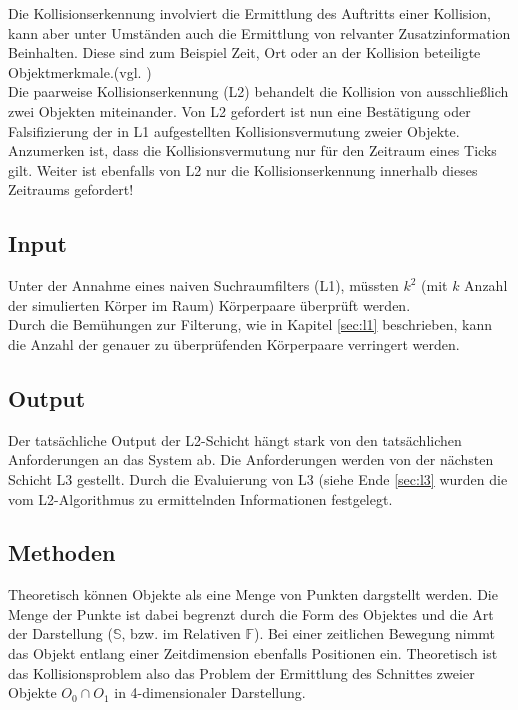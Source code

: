 
Die Kollisionserkennung involviert die Ermittlung des Auftritts einer Kollision, kann aber unter Umständen auch die Ermittlung von relvanter Zusatzinformation Beinhalten. Diese sind zum Beispiel Zeit, Ort oder an der Kollision beteiligte Objektmerkmale.(vgl. \cite[Abschn. 2]{cd2D})\\

Die paarweise Kollisionserkennung (L2) behandelt die Kollision von ausschließlich zwei Objekten miteinander. Von L2 gefordert ist nun eine Bestätigung oder Falsifizierung der in L1 aufgestellten Kollisionsvermutung zweier Objekte.\\
Anzumerken ist, dass die Kollisionsvermutung nur für den Zeitraum eines Ticks gilt. Weiter ist ebenfalls von L2 nur die Kollisionserkennung innerhalb dieses Zeitraums gefordert!

\subsection{Input}
Unter der Annahme eines naiven Suchraumfilters (L1), müssten $k^2$ (mit $k$ Anzahl der simulierten Körper im Raum) Körperpaare überprüft werden.\\
Durch die Bemühungen zur Filterung, wie in Kapitel \ref{sec:l1}
 beschrieben, kann die Anzahl der genauer zu überprüfenden Körperpaare verringert werden.\\


\subsection{Output}
Der tatsächliche Output der L2-Schicht hängt stark von den tatsächlichen Anforderungen an das System ab. Die Anforderungen werden von der nächsten Schicht L3 gestellt. Durch die Evaluierung von L3 (siehe Ende \ref{sec:l3} wurden die vom L2-Algorithmus zu ermittelnden Informationen festgelegt.\\

\subsection{Methoden}
Theoretisch können Objekte als eine Menge von Punkten dargstellt werden. Die Menge der Punkte ist dabei begrenzt durch die Form des Objektes und die Art der Darstellung ($\mathbb{S}$, bzw. im Relativen $\mathbb{F}$).
Bei einer zeitlichen Bewegung nimmt das Objekt entlang einer Zeitdimension ebenfalls Positionen ein. Theoretisch ist das Kollisionsproblem also das Problem der Ermittlung des Schnittes zweier Objekte $O_0 \cap O_1$ in 4-dimensionaler Darstellung.\\

